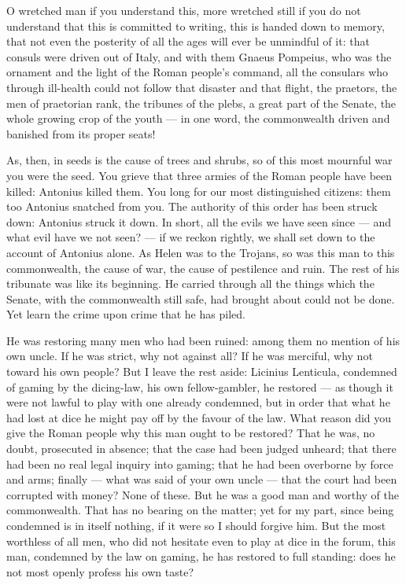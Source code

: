  O wretched man if you understand this, more wretched still if you do not understand that this is committed to writing, this is handed down to memory, that not even the posterity of all the ages will ever be unmindful of it: that consuls were driven out of Italy, and with them Gnaeus Pompeius, who was the ornament and the light of the Roman people's command, all the consulars who through ill-health could not follow that disaster and that flight, the praetors, the men of praetorian rank, the tribunes of the plebs, a great part of the Senate, the whole growing crop of the youth --- in one word, the commonwealth driven and banished from its proper seats!

 As, then, in seeds is the cause of trees and shrubs, so of this most mournful war you were the seed. You grieve that three armies of the Roman people have been killed: Antonius killed them. You long for our most distinguished citizens: them too Antonius snatched from you. The authority of this order has been struck down: Antonius struck it down. In short, all the evils we have seen since --- and what evil have we not seen? --- if we reckon rightly, we shall set down to the account of Antonius alone. As Helen was to the Trojans, so was this man to this commonwealth, the cause of war, the cause of pestilence and ruin. The rest of his tribunate was like its beginning. He carried through all the things which the Senate, with the commonwealth still safe, had brought about could not be done. Yet learn the crime upon crime that he has piled.

 He was restoring many men who had been ruined: among them no mention of his own uncle. If he was strict, why not against all? If he was merciful, why not toward his own people? But I leave the rest aside: Licinius Lenticula, condemned of gaming by the dicing-law, his own fellow-gambler, he restored --- as though it were not lawful to play with one already condemned, but in order that what he had lost at dice he might pay off by the favour of the law. What reason did you give the Roman people why this man ought to be restored? That he was, no doubt, prosecuted in absence; that the case had been judged unheard; that there had been no real legal inquiry into gaming; that he had been overborne by force and arms; finally --- what was said of your own uncle --- that the court had been corrupted with money? None of these. But he was a good man and worthy of the commonwealth. That has no bearing on the matter; yet for my part, since being condemned is in itself nothing, if it were so I should forgive him. But the most worthless of all men, who did not hesitate even to play at dice in the forum, this man, condemned by the law on gaming, he has restored to full standing: does he not most openly profess his own taste?

